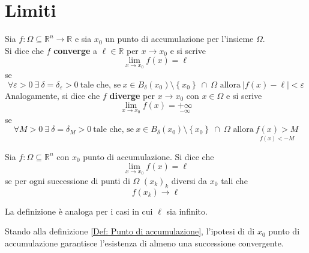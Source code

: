 \section{Limiti}
\begin{definition} \label{Def: Limiti al finito}
    Sia $f:\Omega \subseteq \mathbb{R}^n \to \mathbb{R}$ e sia $x_0$ un punto di accumulazione per l'insieme $\Omega$.\\
    Si dice che $f$ \textbf{converge} a $\ell \in \mathbb{R}$ per $x \to x_0$ e si scrive
    \begin{equation*}
        \lim_{x \to x_0}{f(x)}=\ell
    \end{equation*} 
    se
    \begin{equation*}
        \forall \varepsilon>0 \ \exists\ \delta=\delta_\varepsilon>0\ \text{tale che, se}\ 
                x \in B_\delta(x_0) \setminus \left\{x_0\right\}\ \cap\ \Omega
            \text{ allora}\ |f(x)-\ell|<\varepsilon
    \end{equation*}
    Analogamente, si dice che $f$ \textbf{diverge} per $x \to x_0$ con $x \in \Omega$ e si scrive
    \begin{equation*}
        \lim_{x \to x_0}{f(x)}=\underset{-\infty}{+\infty}
    \end{equation*}
    se 
    \begin{equation*}
        \forall M>0 \ \exists\ \delta=\delta_M>0\ \text{tale che, se}\ 
        x \in B_\delta(x_0) \setminus \left\{x_0\right\}\ \cap\ \Omega
            \text{ allora}\ \underset{f(x)<-M}{f(x)>M}
    \end{equation*}
\end{definition}
\begin{definition}
    Sia $f:\Omega \subseteq \mathbb{R}^n$ con $x_0$ punto di accumulazione. Si dice che 
    \begin{equation*}
        \lim_{x \to x_0}{f(x)}=\ell
    \end{equation*}
    se per ogni successione di punti di $\Omega$ $(x_k)_k$ diversi da $x_0$ tali che
    \begin{equation*}
        f(x_k)\to \ell
    \end{equation*}
    \end{definition}
    \begin{oss}
        La definizione è analoga per i casi in cui $\ell$ sia infinito.
    \end{oss}
    \begin{oss}
        Stando alla definizione \ref{Def: Punto di accumulazione}, l'ipotesi di di $x_0$ punto di accumulazione garantisce l'esistenza di almeno una successione convergente.
    \end{oss}
